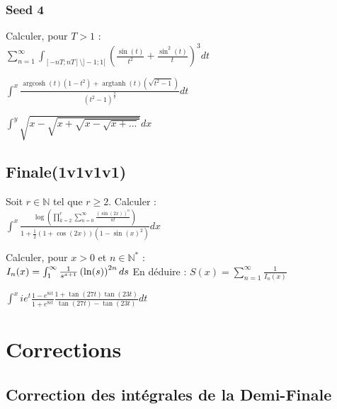 \documentclass[11.5pt,french,table]{article}
\theoremstyle{exercice}
\newenvironment{packed_enum}{
\begin{enumerate}
  \setlength{\itemsep}{11pt}
  \setlength{\parskip}{0pt}
  \setlength{\parsep}{0pt}
}{\end{enumerate}}
\DeclareMathOperator{\argcosh}{argcosh}
\DeclareMathOperator{\argtanh}{argtanh}
\begin{document}
\subsubsection{Seed 4}
    
\begin{packed_enum}

    \item Calculer, pour $T > 1$ :\\ 
    $
    \sum_{n=1}^\infty \int_{[-nT;nT] \setminus ]-1;1[} \left(\frac{\sin(t)}{t^2} + \frac{\sin^2(t)}{t}\right)^3 dt
    $
        
    \item $
    \int_{}^{x} \frac{\argcosh(t)(1 - t^{2}) + \argtanh(t)(\sqrt{t^2 - 1})}{(t^2 -1)^{\frac{3}{2}}} dt
    $

    \item $\int^y \sqrt{x-\sqrt{x+\sqrt{x-\sqrt{x + ...}}}}dx$
    
\end{packed_enum}


\subsection{Finale(1v1v1v1)}

\begin{packed_enum}
    \item Soit $r \in \mathbb{N}$ tel que $r \geq 2$. Calculer :\\
    $\int_{}^{x}\frac{\log(\prod_{k=2}^{r}\sum_{n=0}^{\infty}\frac{(\sin(2x))^n}{n!})}
    {1+\frac{1}{2}(1+\cos(2x))(1-\sin(x)^2)}dx$

    \item Calculer, pour $x > 0$ et $n \in \mathbb{N}^*$ :\\
    $
    I_n(x) = \int_1^\infty \frac{1}{s^{x+1}}\left(\ln(s)\right)^{2n}ds\\
    $
    En déduire :
    $
    S(x) = \sum_{n=1}^\infty \frac{1}{I_n(x)}
    $

    \item $
    \int_{}^{x} ie^t\frac{1 - e^{8it}}{1 + e^{8it}} \frac{1 + \tan(27t)\tan(23t)}{\tan(27t) - \tan(23t)} dt
    $
\end{packed_enum}

\section{Corrections}


\subsection{Correction des intégrales de la Demi-Finale}
\end{document}
